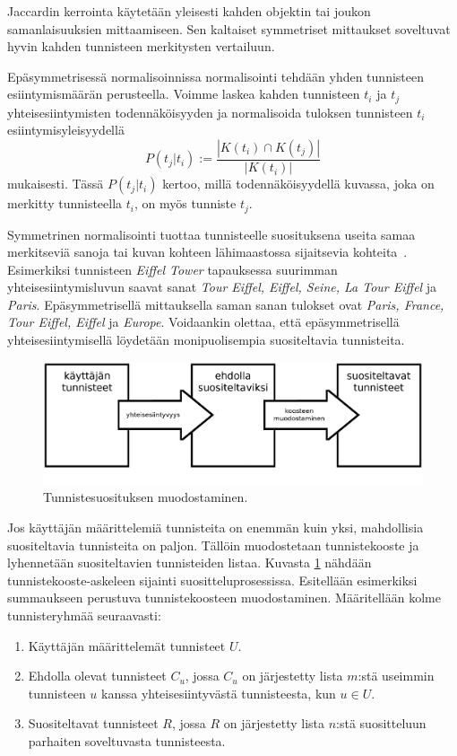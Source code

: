 \documentclass[12pt,finnish]{tktltiki2}
\theoremstyle{definition}
\theoremstyle{remark}
\begin{document}
Jaccardin kerrointa käytetään yleisesti kahden objektin tai joukon samanlaisuuksien mittaamiseen. Sen kaltaiset symmetriset mittaukset soveltuvat hyvin kahden tunnisteen merkitysten vertailuun.

Epäsymmetrisessä normalisoinnissa normalisointi tehdään yhden tunnisteen esiintymismäärän perusteella. Voimme laskea kahden tunnisteen $t_{i}$ ja $t_{j}$ yhteisesiintymisten todennäköisyyden ja normalisoida tuloksen tunnisteen $t_{i}$ esiintymisyleisyydellä 
\begin{displaymath}
P (t_{j} | t_{i}):= \frac{|K(t_{i}) \cap K(t_{j})|} {|K(t_{i})|}
\end{displaymath}
mukaisesti. Tässä $P(t_{j}|t_{i})$ kertoo, millä todennäköisyydellä kuvassa, joka on merkitty tunnisteella $t_{i}$, on myös tunniste $t_{j}$.

Symmetrinen normalisointi tuottaa tunnisteelle suosituksena useita samaa merkitseviä sanoja  tai kuvan kohteen lähimaastossa sijaitsevia kohteita~\cite{Sigurbjornsson:2008:FTR:1367497.1367542}. Esimerkiksi tunnisteen \textit{Eiffel Tower} tapauksessa suurimman yhteisesiintymisluvun saavat sanat \textit{Tour Eiffel, Eiffel, Seine, La Tour Eiffel} ja \textit{Paris}. Epäsymmetrisellä mittauksella saman sanan tulokset ovat \textit{Paris, France, Tour Eiffel, Eiffel} ja \textit{Europe}. Voidaankin olettaa, että epäsymmetrisellä yhteisesiintymisellä löydetään monipuolisempia suositeltavia tunnisteita.

\begin{figure}[]
\includegraphics[width = 420pt]{tunnisteidensuosittelu.eps}\caption{Tunnistesuosituksen muodostaminen.}
\label{tunnisteidensuosittelu}
\end{figure}

Jos käyttäjän määrittelemiä tunnisteita on enemmän kuin yksi, mahdollisia suositeltavia tunnisteita on paljon. Tällöin muodostetaan tunnistekooste ja lyhennetään suositeltavien tunnisteiden listaa. Kuvasta \ref{tunnisteidensuosittelu} nähdään tunnistekooste-askeleen sijainti suositteluprosessissa.
Esitellään esimerkiksi summaukseen perustuva tunnistekoosteen muodostaminen. Määritellään kolme tunnisteryhmää seuraavasti:
\begin{enumerate}
\item Käyttäjän määrittelemät tunnisteet $U$.

\item Ehdolla olevat tunnisteet $C_{u}$, jossa $C_{u}$ on järjestetty lista $m$:stä useimmin tunnisteen $u$ kanssa yhteisesiintyvästä tunnisteesta, kun $u \in U$.

\item Suositeltavat tunnisteet $R$, jossa $R$ on järjestetty lista $n$:stä suositteluun parhaiten soveltuvasta tunnisteesta.
\end{enumerate}
\end{document}
